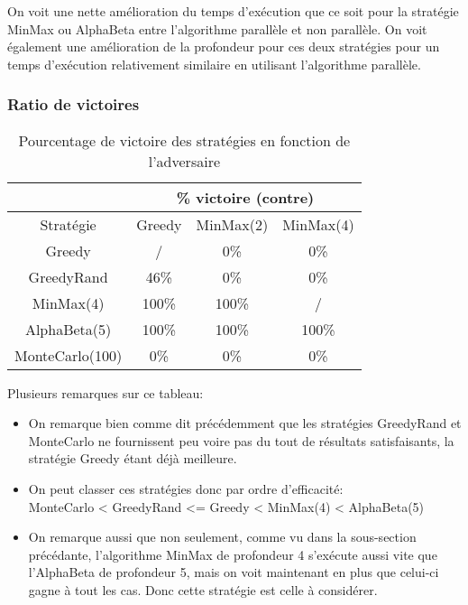 \documentclass[10pt]{article}
\begin{document}
On voit une nette amélioration du temps d'exécution que ce soit pour la stratégie MinMax ou AlphaBeta entre l'algorithme parallèle et non parallèle.
On voit également une amélioration de la profondeur pour ces deux stratégies pour un temps d'exécution relativement similaire en utilisant l'algorithme parallèle. 

\subsubsection{Ratio de victoires}

\begin{table}[H]
    \begin{center}
        \begin{tabular}{@{}|c|ccc|@{}}
            \toprule
            \multicolumn{1}{|l|}{} & \multicolumn{3}{c|}{\% victoire (contre)}                                              \\ \midrule
            Stratégie              & \multicolumn{1}{c|}{Greedy}               & \multicolumn{1}{c|}{MinMax(2)} & MinMax(4) \\ \midrule
            Greedy                 & \multicolumn{1}{c|}{/}                    & \multicolumn{1}{c|}{0\%}       & 0\%       \\
            GreedyRand             & \multicolumn{1}{c|}{46\%}                 & \multicolumn{1}{c|}{0\%}       & 0\%       \\
            MinMax(4)              & \multicolumn{1}{c|}{100\%}                & \multicolumn{1}{c|}{100\%}     & /         \\
            AlphaBeta(5)           & \multicolumn{1}{c|}{100\%}                & \multicolumn{1}{c|}{100\%}     & 100\%     \\
            MonteCarlo(100)        & \multicolumn{1}{c|}{0\%}                  & \multicolumn{1}{c|}{0\%}       & 0\%       \\ \bottomrule
        \end{tabular}
        \caption{Pourcentage de victoire des stratégies en fonction de l'adversaire}
    \end{center}
\end{table}

Plusieurs remarques sur ce tableau:

\begin{itemize}
    \item On remarque bien comme dit précédemment que les stratégies GreedyRand et MonteCarlo ne fournissent peu voire pas du tout de résultats satisfaisants, la stratégie Greedy étant déjà meilleure.
    \item On peut classer ces stratégies donc par ordre d'efficacité: \\ MonteCarlo < GreedyRand <= Greedy < MinMax(4) < AlphaBeta(5)
    \item On remarque aussi que non seulement, comme vu dans la sous-section précédante, l'algorithme MinMax de profondeur 4 s'exécute aussi vite que l'AlphaBeta de profondeur 5, mais on voit maintenant en plus que celui-ci gagne à tout les cas. Donc cette stratégie est celle à considérer.
\end{itemize}
\end{document}
